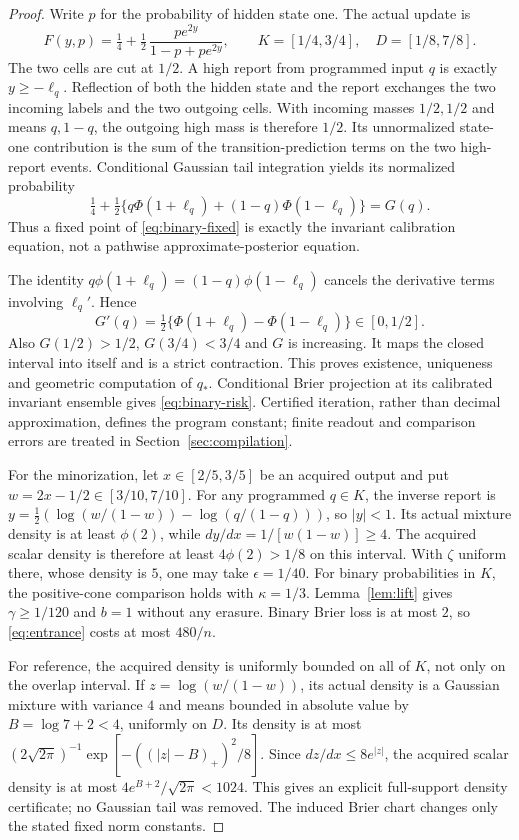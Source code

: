 \begin{proof}
Write $p$ for the probability of hidden state one. The actual update is
\[
 F(y,p)=\tfrac14+\tfrac12\,\frac{pe^{2y}}{1-p+pe^{2y}},
 \qquad K=[1/4,3/4],\quad D=[1/8,7/8].
\]
The two cells are cut at $1/2$. A high report from programmed input $q$ is exactly $y\ge-\ell_q$. Reflection of both the hidden state and the report exchanges the two incoming labels and the two outgoing cells. With incoming masses $1/2,1/2$ and means $q,1-q$, the outgoing high mass is therefore $1/2$. Its unnormalized state-one contribution is the sum of the transition-prediction terms on the two high-report events. Conditional Gaussian tail integration yields its normalized probability
\[
 \tfrac14+\tfrac12\{q\Phi(1+\ell_q)+(1-q)\Phi(1-\ell_q)\}=G(q).
\]
Thus a fixed point of \eqref{eq:binary-fixed} is exactly the invariant calibration equation, not a pathwise approximate-posterior equation.

The identity $q\phi(1+\ell_q)=(1-q)\phi(1-\ell_q)$ cancels the derivative terms involving $\ell_q'$. Hence
\[
 G'(q)=\tfrac12\{\Phi(1+\ell_q)-\Phi(1-\ell_q)\}\in[0,1/2].
\]
Also $G(1/2)>1/2$, $G(3/4)<3/4$ and $G$ is increasing. It maps the closed interval into itself and is a strict contraction. This proves existence, uniqueness and geometric computation of $q_*$. Conditional Brier projection at its calibrated invariant ensemble gives \eqref{eq:binary-risk}. Certified iteration, rather than decimal approximation, defines the program constant; finite readout and comparison errors are treated in Section~\ref{sec:compilation}.

For the minorization, let $x\in[2/5,3/5]$ be an acquired output and put $w=2x-1/2\in[3/10,7/10]$. For any programmed $q\in K$, the inverse report is
$y=\frac12(\log(w/(1-w))-\log(q/(1-q)))$, so $|y|<1$. Its actual mixture density is at least $\phi(2)$, while $dy/dx=1/[w(1-w)]\ge4$. The acquired scalar density is therefore at least $4\phi(2)>1/8$ on this interval. With $\zeta$ uniform there, whose density is $5$, one may take $\epsilon=1/40$. For binary probabilities in $K$, the positive-cone comparison holds with $\kappa=1/3$. Lemma~\ref{lem:lift} gives $\gamma\ge1/120$ and $b=1$ without any erasure. Binary Brier loss is at most $2$, so \eqref{eq:entrance} costs at most $480/n$.

For reference, the acquired density is uniformly bounded on all of $K$, not only on the overlap interval. If $z=\log(w/(1-w))$, its actual density is a Gaussian mixture with variance $4$ and means bounded in absolute value by $B=\log7+2<4$, uniformly on $D$. Its density is at most $(2\sqrt{2\pi})^{-1}\exp[-((|z|-B)_+)^2/8]$. Since $dz/dx\le8e^{|z|}$, the acquired scalar density is at most $4e^{B+2}/\sqrt{2\pi}<1024$. This gives an explicit full-support density certificate; no Gaussian tail was removed. The induced Brier chart changes only the stated fixed norm constants.
\end{proof}
